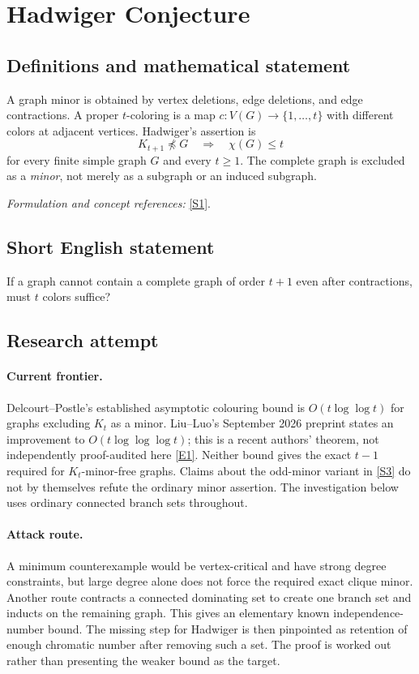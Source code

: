\documentclass[11pt,a4paper]{article}
\numberwithin{equation}{section}
\newcommand{\sref}[2]{\hyperlink{source:#1:#2}{[S#2]}}
\newcommand{\eref}[2]{\hyperlink{extra:#1:#2}{[E#2]}}
\newif\ifshowcatalogue
\newcommand{\cataloguescope}[1]{\ifshowcatalogue
 \paragraph{Exact scope in the supplied catalogue.}
 \begin{quote}\small #1\end{quote}\fi}
\begin{document}
\setcounter{section}{79}
\section{\texorpdfstring{Hadwiger Conjecture}{Hadwiger Conjecture}}\label{80}
\subsection{Definitions and mathematical statement}
A graph minor is obtained by vertex deletions, edge deletions, and edge contractions. A proper $t$-coloring is a map $c:V(G)\to\{1,\ldots,t\}$ with different colors at adjacent vertices. Hadwiger's assertion is
\[
 K_{t+1}\not\preccurlyeq G\quad\Longrightarrow\quad\chi(G)\le t
\]
for every finite simple graph $G$ and every $t\ge1$. The complete graph is excluded as a \emph{minor}, not merely as a subgraph or an induced subgraph.
\par\smallskip\textit{Formulation and concept references:} \sref{80}{1}.
\cataloguescope{Prove that every simple graph with no K\_\{t+1\} minor is t-colourable for every integer t >= 1.}
\subsection{Short English statement}
If a graph cannot contain a complete graph of order $t+1$ even after contractions, must $t$ colors suffice?
\subsection{Research attempt}

\paragraph{Current frontier.}
Delcourt--Postle's established asymptotic colouring bound is
$O(t\log\log t)$ for graphs excluding $K_t$ as a minor. Liu--Luo's September
2026 preprint states an improvement to $O(t\log\log\log t)$; this is a
recent authors' theorem, not independently proof-audited here
\eref{80}{1}. Neither bound gives the exact $t-1$ required for $K_t$-minor-free
graphs. Claims about the odd-minor variant in \sref{80}{3} do not by
themselves refute the ordinary minor assertion. The investigation below
uses ordinary connected branch sets throughout.

\paragraph{Attack route.}
A minimum counterexample would be vertex-critical and have strong degree
constraints, but large degree alone does not force the required exact
clique minor. Another route contracts a connected dominating set to create
one branch set and inducts on the remaining graph. This gives an elementary
known independence-number bound. The missing step for Hadwiger is then
pinpointed as retention of enough chromatic number after removing such a
set. The proof is worked out rather than presenting the weaker bound as
the target.
\end{document}
